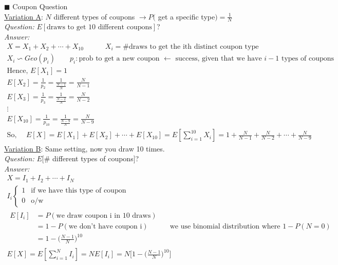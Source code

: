 \begin{example}
$\blacksquare$ Coupon Question\\
\underline{Variation A}: $N$ different types of coupons $\rightarrow P($ get a specific type$) = \frac{1}{N}$\\
\textit{Question:} $E[\text{draws to get 10 different coupons}]$?\\ 
\textit{Answer:}
\begin{gather*}
	X = X_1 + X_2 + \cdots + X_{10} \quad \quad \quad X_i = \text{\# draws to get the ith distinct coupon type}\\
	\boxed{X_i \backsim Geo(p_i)} \quad \quad p_i: \text{prob to get a new coupon $\leftarrow$ success, given that we have $i-1$ types of coupons}\\
	\text{Hence, } E[X_1] = 1\\
	E[X_2] = \frac{1}{p_2} = \frac{1}{\frac{N-1}{N}} = \frac{N}{N-1}\\
	E[X_3] = \frac{1}{p_3} = \frac{1}{\frac{N-2}{N}} = \frac{N}{N-2}\\
	\vdots\\
	E[X_{10}] = \frac{1}{p_{10}} = \frac{1}{\frac{N-9}{N}} = \frac{N}{N-9}\\
	\text{So, } \quad E[X] = E[X_1] + E[X_2] + \cdots + E[X_{10}] = E[\sum\limits_{i=1}^{10} X_i] = 1 + \frac{N}{N-1} + \frac{N}{N-2} + \cdots + \frac{N}{N-9}
\end{gather*}
\underline{Variation B}: Same setting, now you draw 10 times.\\
\textit{Question:} $E[\#$ different types of coupons$]$?\\ 
\textit{Answer:}
\begin{gather*}
	X = I_1 + I_2 + \cdots + I_N\\
	I_i
	\begin{cases}
		1 & \text{if we have this type of coupon}\\
		0 & \text{o/w}
	\end{cases}\\
	\begin{align*}
		E[I_i]  & = P(\text{we draw coupon i in 10 draws})\\
		& = 1 - P(\text{we don't have coupon i}) \quad \quad \quad \text{we use binomial distribution where } 1-P(N=0)\\
		& = 1 - \bigg( \frac{N-1}{N} \bigg)^{10}
	\end{align*}\\
	E[X] = E[\sum\limits_{i=1}^{N} I_i] = N E[I_i] = \boxed{N \bigg[ 1 - \bigg( \frac{N-1}{N} \bigg)^{10} \bigg]}
\end{gather*}
\end{example}
